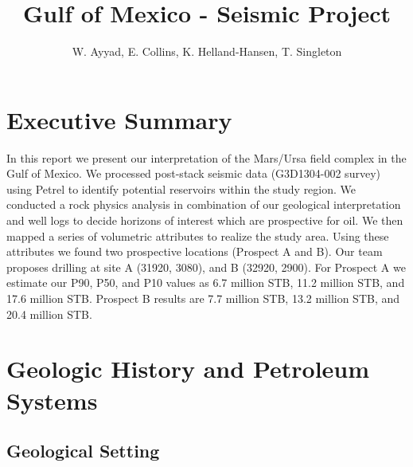 \documentclass[fleqn]{article}
\title{Gulf of Mexico - Seismic Project}
\author{
    W. Ayyad,
    E. Collins,
    K. Helland-Hansen,
    T. Singleton
}
\begin{document}
\maketitle
\tableofcontents
\pagebreak
\section{Executive Summary}
In this report we present our interpretation of the Mars/Ursa field complex in the Gulf of Mexico. We processed post-stack seismic data (G3D1304-002 survey) using Petrel to identify potential reservoirs within the study region. We conducted a rock physics analysis in combination of our geological interpretation and well logs to decide horizons of interest which are prospective for oil. We then mapped a series of volumetric attributes to realize the study area. Using these attributes we found two prospective locations (Prospect A and B). Our team proposes drilling at site A (31920, 3080), and B (32920, 2900). For Prospect A we estimate our P90, P50, and P10 values as 6.7 million STB, 11.2 million STB, and 17.6 million STB. Prospect B results are 7.7 million STB, 13.2 million STB, and 20.4 million STB. 

\section{Geologic History and Petroleum Systems}

\subsection{Geological Setting}
\end{document}
